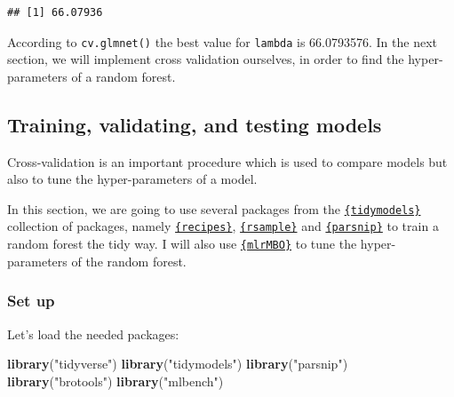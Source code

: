 \documentclass[]{gitbook}
\newenvironment{Shaded}{\begin{snugshade}}{\end{snugshade}}
\newcommand{\CommentTok}[1]{\textcolor[rgb]{0.56,0.35,0.01}{\textit{#1}}}
\newcommand{\KeywordTok}[1]{\textcolor[rgb]{0.13,0.29,0.53}{\textbf{#1}}}
\newcommand{\NormalTok}[1]{#1}
\newcommand{\OperatorTok}[1]{\textcolor[rgb]{0.81,0.36,0.00}{\textbf{#1}}}
\newcommand{\StringTok}[1]{\textcolor[rgb]{0.31,0.60,0.02}{#1}}
\theoremstyle{definition}
\theoremstyle{definition}
\theoremstyle{definition}
\theoremstyle{remark}
\begin{document}
\begin{Shaded}
\end{Shaded}

\begin{verbatim}
## [1] 66.07936
\end{verbatim}

According to \texttt{cv.glmnet()} the best value for \texttt{lambda} is
66.0793576. In the next section, we will implement cross validation
ourselves, in order to find the hyper-parameters of a random forest.

\hypertarget{training-validating-and-testing-models}{%
\subsection{Training, validating, and testing
models}\label{training-validating-and-testing-models}}

Cross-validation is an important procedure which is used to compare
models but also to tune the hyper-parameters of a model.

In this section, we are going to use several packages from the
\href{https://github.com/tidymodels}{\texttt{\{tidymodels\}}} collection
of packages, namely
\href{https://tidymodels.github.io/recipes/}{\texttt{\{recipes\}}},
\href{https://tidymodels.github.io/rsample/}{\texttt{\{rsample\}}} and
\href{https://tidymodels.github.io/parsnip/}{\texttt{\{parsnip\}}} to
train a random forest the tidy way. I will also use
\href{http://mlrmbo.mlr-org.com/}{\texttt{\{mlrMBO\}}} to tune the
hyper-parameters of the random forest.

\hypertarget{set-up}{%
\subsubsection{Set up}\label{set-up}}

Let's load the needed packages:

\begin{Shaded}
\begin{Highlighting}[]
\KeywordTok{library}\NormalTok{(}\StringTok{"tidyverse"}\NormalTok{)}
\KeywordTok{library}\NormalTok{(}\StringTok{"tidymodels"}\NormalTok{)}
\KeywordTok{library}\NormalTok{(}\StringTok{"parsnip"}\NormalTok{)}
\KeywordTok{library}\NormalTok{(}\StringTok{"brotools"}\NormalTok{)}
\KeywordTok{library}\NormalTok{(}\StringTok{"mlbench"}\NormalTok{)}
\end{Highlighting}
\end{Shaded}
\end{document}
